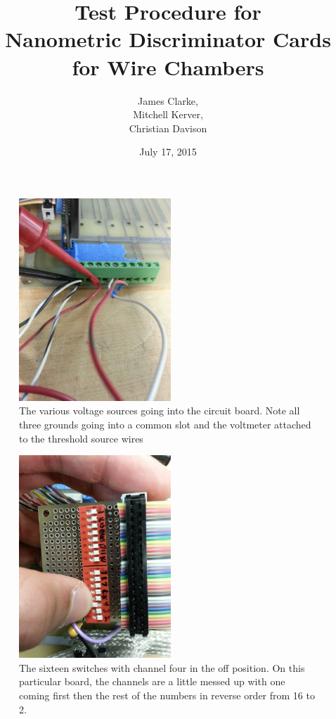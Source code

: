 \documentclass[final]{report}
\begin{document}
\title{Test Procedure for \\
  Nanometric Discriminator Cards \\
  for Wire Chambers}

\date{July 17, 2015}

\author{James Clarke,\\
Mitchell Kerver,\\
Christian Davison }

\maketitle

\begin{figure}[1]
  \centering
  \includegraphics[height=3in, angle = -90]{Figure1.jpg}
  \caption{The various voltage sources going into the circuit board. Note all three grounds going into a common slot and the voltmeter attached to the threshold source wires}
  \label{fig:bus}
\end{figure}
\begin{figure}[2]
  \centering
  \includegraphics[height=3in]{Figure2.jpg}
  \caption{The sixteen switches with channel four in the off position. On this particular board, the channels are a little messed up with one coming first then the rest of the numbers in reverse order from 16 to 2.}
  \label{fig:switches}
\end{figure}
\end{document}
